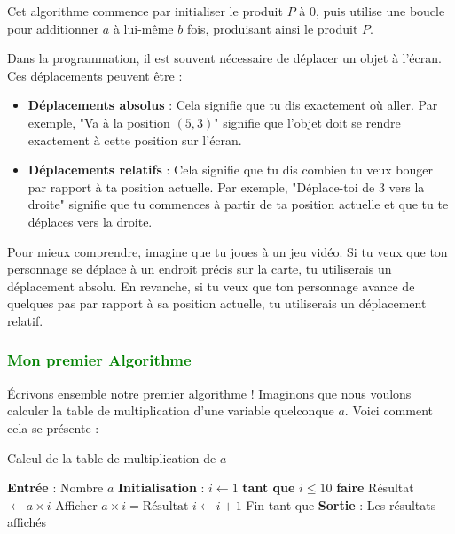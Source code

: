 \documentclass{article}
\begin{document}
Cet algorithme commence par initialiser le produit \( P \) à 0, puis utilise une boucle pour additionner \( a \) à lui-même \( b \) fois, produisant ainsi le produit \( P \).

\vspace{0.15cm}

Dans la programmation, il est souvent nécessaire de déplacer un objet à l'écran. Ces déplacements peuvent être :

\begin{tcolorbox}[colback=red!10!white, colframe=red!75!black, title=\textcolor{white}{Définitions}]
\begin{itemize}
    \item \textbf{Déplacements absolus} : Cela signifie que tu dis exactement où aller. Par exemple, "Va à la position \( (5, 3) \)" signifie que l'objet doit se rendre exactement à cette position sur l'écran.
    \item \textbf{Déplacements relatifs} : Cela signifie que tu dis combien tu veux bouger par rapport à ta position actuelle. Par exemple, "Déplace-toi de 3 vers la droite" signifie que tu commences à partir de ta position actuelle et que tu te déplaces vers la droite.
\end{itemize}
\end{tcolorbox}

Pour mieux comprendre, imagine que tu joues à un jeu vidéo. Si tu veux que ton personnage se déplace à un endroit précis sur la carte, tu utiliserais un déplacement absolu. En revanche, si tu veux que ton personnage avance de quelques pas par rapport à sa position actuelle, tu utiliserais un déplacement relatif.

\subsubsection{\textcolor{green}{Mon premier Algorithme}}

Écrivons ensemble notre premier algorithme ! Imaginons que nous voulons calculer la table de multiplication d'une variable quelconque \( a \). Voici comment cela se présente :

\begin{tcolorbox}[colback=brown!10!white, colframe=brown!75!black, title=\textcolor{white}{Mon premier Algorithme}]

\begin{algorithm}[H]
    \caption{Calcul de la table de multiplication de \( a \)}
    \begin{algorithmic}[1]
        \State \textbf{Entrée} : Nombre \( a \)
        \State \textbf{Initialisation} : \( i \gets 1 \)
        \State \textbf{tant que}  \( i \leq 10 \) \textbf{faire} 
            \State Résultat \( \gets a \times i \)
            \State Afficher \( a \times i = \text{Résultat} \)
            \State \( i \gets i + 1 \)
        \State Fin tant que
        \State \textbf{Sortie} : Les résultats affichés
    \end{algorithmic}
\end{algorithm}
\end{tcolorbox}
\end{document}
